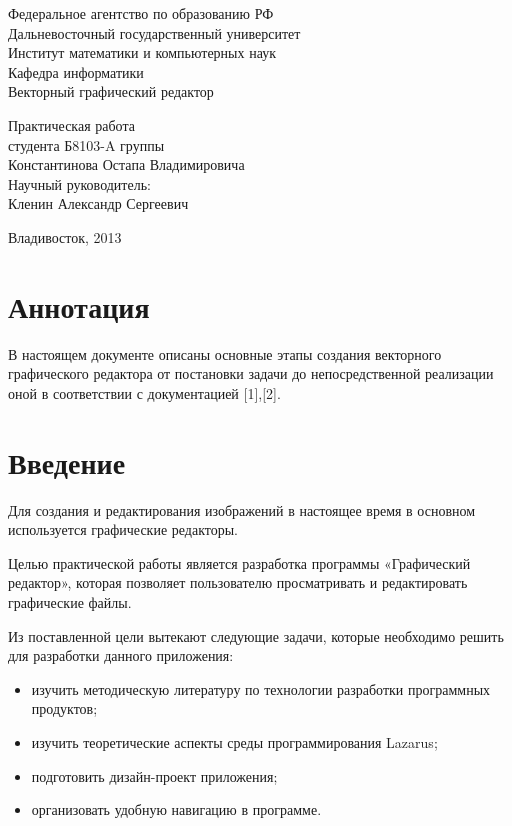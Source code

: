 \documentclass[a4paper,12pt]{article}
\begin{document}
 

\begin{titlepage}
\sffamily \center \Large
	Федеральное агентство по образованию РФ\\
	Дальневосточный государственный университет\\
	Институт математики и компьютерных наук\\
	Кафедра информатики\\[7cm]
\Large
	Векторный графический редактор\\[7cm]
\Large
\begin{flushright}
	Практическая работа\\
	студента Б8103-A группы\\
	Константинова Остапа Владимировича\\
	Научный руководитель:\\
	Кленин Александр Сергеевич\\
\end{flushright}
\vfill
Владивосток, 2013
\end{titlepage}

\tableofcontents
\newpage

\section{Аннотация}

В настоящем документе описаны основные этапы создания векторного графического редактора от постановки задачи до непосредственной реализации оной в соответствии с документацией [1],[2]. 


\section{Введение}

Для создания и редактирования изображений в настоящее время в основном используется графические редакторы.

Целью практической работы является разработка программы «Графический редактор», которая позволяет пользователю просматривать и редактировать графические файлы.

Из поставленной цели вытекают следующие задачи, которые необходимо решить для разработки данного приложения:

\begin{itemize}
	\item  изучить методическую литературу по технологии разработки программных продуктов;
	\item  изучить теоретические аспекты среды программирования Lazarus;
	\item  подготовить дизайн-проект приложения;
	\item  организовать удобную навигацию в программе.
\end{itemize}
\end{document}
